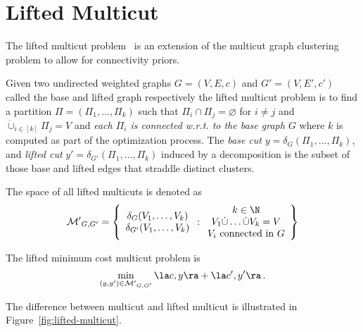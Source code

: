 \section{Lifted Multicut}
\label{sec:lifted-multicut}

The lifted multicut problem~\cite{keuper2015efficient} is an extension of the multicut graph clustering problem to allow for connectivity priors.

\begin{definition}
Given two undirected weighted graphs $G=(V,E,c)$ and $G'=(V,E',c')$  called the base and lifted graph respectively the lifted multicut problem is to find a partition $\Pi = (\Pi_1,\ldots,\Pi_k)$ such that $\Pi_i \cap \Pi_j=\varnothing$ for $i \neq j$ and $\dot{\cup}_{i\in[k]} \Pi_j = V$ and \emph{each $\Pi_i$ is connected w.r.t. to the base graph $G$} where $k$ is computed as part of the optimization process.
The \emph{base cut} $y=\delta_G(\Pi_1,\ldots,\Pi_k)$, and \emph{lifted cut} $y' = \delta_{G'}(\Pi_1,\ldots,\Pi_k)$ induced by a decomposition is the subset of those base and lifted edges that straddle distinct clusters.

The space of all lifted multicuts is denoted as
\begin{equation}
  \mathcal{M'}_{G,G'} = \left\{ \begin{array}{c}\delta_G(V_1,\ldots,V_k)\\ \delta_{G'}(V_1,\ldots,V_k) \end{array} : 
\begin{array}{c}
  k \in \N \\
  V_1 \dot\cup \ldots \dot\cup V_k = V\\
  V_i \text{ connected in } G
\end{array} \right\}%
\end{equation} 

The lifted minimum cost multicut problem is
\begin{equation}
  \label{eq:lifted-multicut}
  \min_{(y,y') \in \mathcal{M'}_{G,G'}} \la c, y \ra + \la c', y' \ra\,.
\end{equation} 
\end{definition}

The difference between multicut and lifted multicut is illustrated in Figure~\ref{fig:lifted-multicut}.

